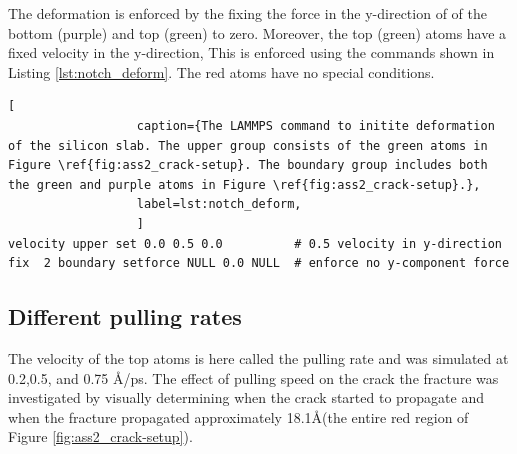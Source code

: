 \documentclass[10pt,a4paper]{labreport}
\begin{document}
The deformation is enforced by the fixing the force in the y-direction of of the bottom (purple) and top (green) to zero. Moreover, the top (green) atoms have a fixed velocity in the y-direction, This is enforced using the commands shown in Listing \ref{lst:notch_deform}. The red atoms have no special conditions. 
\begin{lstlisting}[
                  caption={The LAMMPS command to initite deformation of the silicon slab. The upper group consists of the green atoms in Figure \ref{fig:ass2_crack-setup}. The boundary group includes both the green and purple atoms in Figure \ref{fig:ass2_crack-setup}.},
                  label=lst:notch_deform,
                  ]
velocity upper set 0.0 0.5 0.0          # 0.5 velocity in y-direction
fix  2 boundary setforce NULL 0.0 NULL  # enforce no y-component force
\end{lstlisting}


\subsection{Different pulling rates}
The velocity of the top atoms is here called the pulling rate and was simulated at 0.2,0.5, and 0.75 \AA/ps. 
The effect of pulling speed on the crack the fracture was investigated by visually determining  when the crack started to propagate and when the fracture propagated approximately 18.1\AA (the entire red region of Figure \ref{fig:ass2_crack-setup}). 
\end{document}
